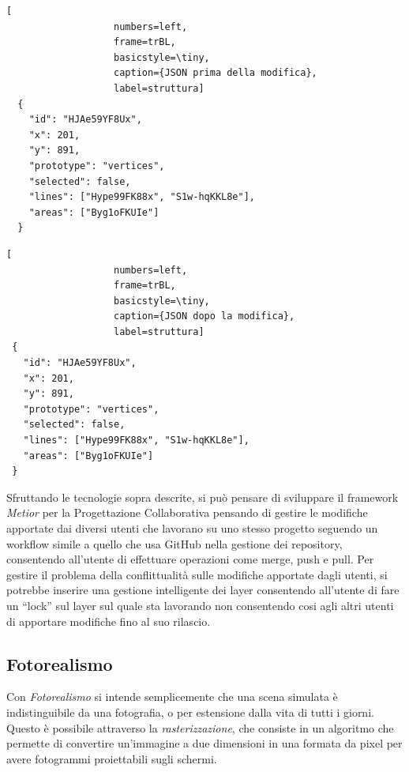 \noindent
\begin{minipage}{.45\textwidth}
\begin{lstlisting}[
                   numbers=left,
                   frame=trBL,
                   basicstyle=\tiny,
                   caption={JSON prima della modifica},
                   label=struttura]
  {
    "id": "HJAe59YF8Ux",
    "x": 201,
    "y": 891,
    "prototype": "vertices",
    "selected": false,
    "lines": ["Hype99FK88x", "S1w-hqKKL8e"],
    "areas": ["Byg1oFKUIe"]
  }
\end{lstlisting}
\end{minipage}\hfill
\begin{minipage}{.45\textwidth}
\begin{lstlisting}[
                   numbers=left,
                   frame=trBL,
                   basicstyle=\tiny,
                   caption={JSON dopo la modifica},
                   label=struttura]
 {
   "id": "HJAe59YF8Ux",
   "x": 201,
   "y": 891,
   "prototype": "vertices",
   "selected": false,
   "lines": ["Hype99FK88x", "S1w-hqKKL8e"],
   "areas": ["Byg1oFKUIe"]
 }
\end{lstlisting}
\end{minipage}

Sfruttando le tecnologie sopra descrite, si può pensare di sviluppare il framework \emph{Metior}
per la Progettazione Collaborativa pensando di gestire le modifiche apportate dai diversi utenti che lavorano su uno
stesso progetto seguendo un workflow simile a quello che usa GitHub nella gestione dei repository,
consentendo all'utente di effettuare operazioni come merge, push e pull.
Per gestire il problema della conflittualità sulle modifiche apportate dagli utenti,
si potrebbe inserire una gestione intelligente dei layer consentendo all'utente di fare un ``lock'' sul layer sul quale
sta lavorando non consentendo cosi agli altri utenti di apportare modifiche fino al suo rilascio.
\newpage

\subsection{Fotorealismo}
\label{sec:conclusions_section_2_sub_3}
Con \emph{Fotorealismo} si intende semplicemente che una scena simulata \`e indistinguibile da una fotografia, o per estensione
dalla vita di tutti i giorni. Questo è possibile attraverso la \emph{rasterizzazione}, che consiste in un algoritmo che
permette di convertire un'immagine a due dimensioni in una formata da pixel per avere fotogrammi proiettabili sugli schermi.

